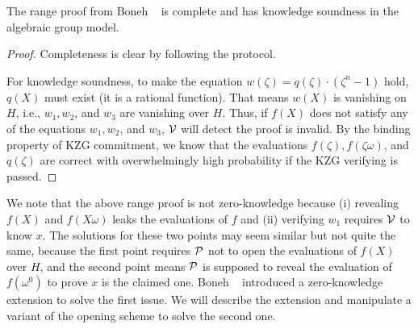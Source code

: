 \begin{lemma}
\label{lemma:range}
The range proof from Boneh \etal~\cite{rangeproof} is complete and has knowledge soundness in the algebraic group model.
\end{lemma}

\begin{proof}
Completeness is clear by following the protocol.

For knowledge soundness, to make the equation $w(\zeta)=q(\zeta)\cdot(\zeta^n-1)$ hold, $q(X)$ must exist (it is a rational function). That means $w(X)$ is vanishing on $H$, i.e., $w_1,w_2$, and $w_3$ are vanishing over $H$. Thus, if $f(X)$ does not satisfy any of the equations $w_1,w_2$, and $w_3$, $\mathcal{V}$ will detect the proof is invalid. By the binding property of KZG commitment, we know that the evaluations $f(\zeta),f(\zeta\omega)$, and $q(\zeta)$ are correct with overwhelmingly high probability if the KZG verifying is passed.
\end{proof}
We note that the above range proof is not zero-knowledge because (i) revealing $f(X)$ and $f(X\omega)$ leaks the evaluations of $f$ and (ii) verifying $w_1$ requires $\mathcal{V}$ to know $x$. The solutions for these two points may seem similar but not quite the same, because the first point requires $\mathcal{P}$ not to open the evaluations of $f(X)$ over $H$, and the second point means $\mathcal{P}$ is supposed to reveal the evaluation of $f(\omega^0)$ to prove $x$ is the claimed one. Boneh \etal~\cite{rangeproof} introduced a zero-knowledge extension to solve the first issue. We will describe the extension and manipulate a variant of the opening scheme to solve the second one.

